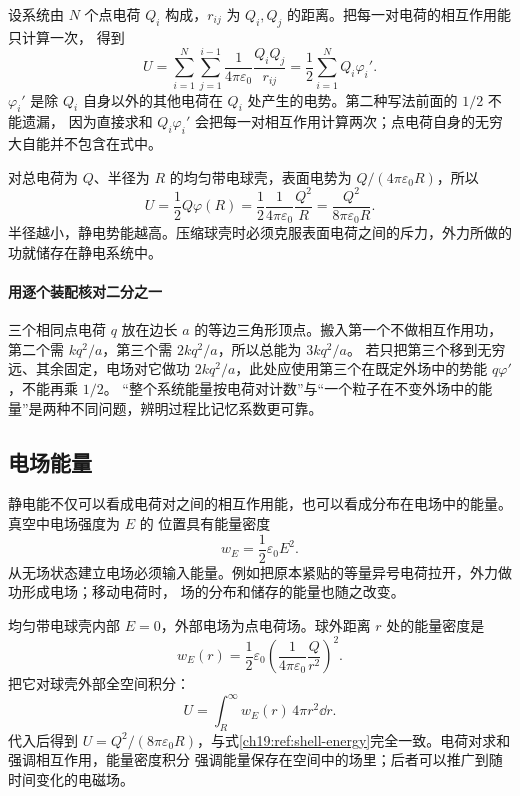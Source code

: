设系统由 $N$ 个点电荷 $Q_i$ 构成，$r_{ij}$ 为 $Q_i,Q_j$ 的距离。把每一对电荷的相互作用能只计算一次，
得到
\begin{equation}
  \boxed{U=\sum_{i=1}^{N}\sum_{j=1}^{i-1}
  \frac{1}{4\pi\varepsilon_0}\frac{Q_iQ_j}{r_{ij}}
  =\frac12\sum_{i=1}^{N}Q_i\varphi_i'}.
\end{equation}
$\varphi_i'$ 是除 $Q_i$ 自身以外的其他电荷在 $Q_i$ 处产生的电势。第二种写法前面的 $1/2$ 不能遗漏，
因为直接求和 $Q_i\varphi_i'$ 会把每一对相互作用计算两次；点电荷自身的无穷大自能并不包含在式中。

对总电荷为 $Q$、半径为 $R$ 的均匀带电球壳，表面电势为
$Q/(4\pi\varepsilon_0R)$，所以
\begin{equation}
  \label{ch19:ref:shell-energy}\boxed{U=\frac12Q\varphi(R)
  =\frac{1}{2}\frac{1}{4\pi\varepsilon_0}\frac{Q^2}{R}}
  =\boxed{\frac{Q^2}{8\pi\varepsilon_0R}}.
\end{equation}
半径越小，静电势能越高。压缩球壳时必须克服表面电荷之间的斥力，外力所做的功就储存在静电系统中。


\paragraph{用逐个装配核对二分之一}
三个相同点电荷 $q$ 放在边长 $a$ 的等边三角形顶点。搬入第一个不做相互作用功，第二个需 $kq^2/a$，第三个需 $2kq^2/a$，所以总能为 $3kq^2/a$。
若只把第三个移到无穷远、其余固定，电场对它做功 $2kq^2/a$，此处应使用第三个在既定外场中的势能 $q\varphi'$，不能再乘 $1/2$。
“整个系统能量按电荷对计数”与“一个粒子在不变外场中的能量”是两种不同问题，辨明过程比记忆系数更可靠。


\subsection{电场能量}


静电能不仅可以看成电荷对之间的相互作用能，也可以看成分布在电场中的能量。真空中电场强度为 $E$ 的
位置具有能量密度
\begin{equation}
  \boxed{w_E=\frac12\varepsilon_0E^2}.
\end{equation}
从无场状态建立电场必须输入能量。例如把原本紧贴的等量异号电荷拉开，外力做功形成电场；移动电荷时，
场的分布和储存的能量也随之改变。

均匀带电球壳内部 $E=0$，外部电场为点电荷场。球外距离 $r$ 处的能量密度是
\[
  w_E(r)=\frac12\varepsilon_0
  \left(\frac{1}{4\pi\varepsilon_0}\frac{Q}{r^2}\right)^2.
\]
把它对球壳外部全空间积分：
\begin{equation}
  \boxed{U=\int_R^\infty w_E(r)\,4\pi r^2\dd r}.
\end{equation}
代入后得到 $U=Q^2/(8\pi\varepsilon_0R)$，与式\eqref{ch19:ref:shell-energy}完全一致。电荷对求和强调相互作用，能量密度积分
强调能量保存在空间中的场里；后者可以推广到随时间变化的电磁场。

